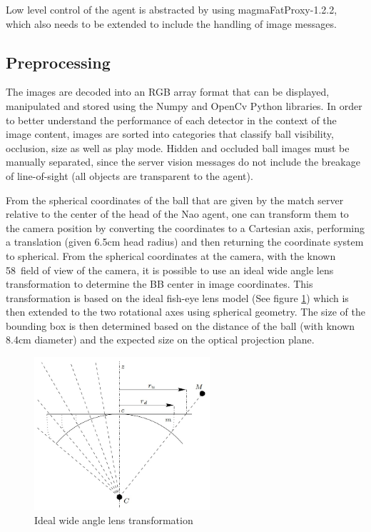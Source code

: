 \documentclass[a4paper,twoside,12pt]{report}
\begin{document}
Low level control of the agent is abstracted by using magmaFatProxy-1.2.2, which also needs to be extended to include the handling of image messages.

\subsection{Preprocessing}

The images are decoded into an RGB array format that can be displayed, manipulated and stored using the Numpy and OpenCv Python libraries. In order to better understand the performance of each detector in the context of the image content, images are sorted into categories that classify ball visibility, occlusion, size as well as play mode. Hidden and occluded ball images must be manually separated, since the server vision messages do not include the breakage of line-of-sight (all objects are transparent to the agent).

From the spherical coordinates of the ball that are given by the match server relative to the center of the head of the Nao agent, one can transform them to the camera position by converting the coordinates to a Cartesian axis, performing a translation (given 6.5cm head radius) and then returning the coordinate system to spherical. From the spherical coordinates at the camera, with the known 58\textdegree\ field of view of the camera, it is possible to use an ideal wide angle lens transformation to determine the BB center in image coordinates. This transformation is based on the ideal fish-eye lens model (See figure \ref{fig:wideangle}) which is then extended to the two rotational axes using spherical geometry. The size of the bounding box is then determined based on the distance of the ball (with known 8.4cm diameter) and the expected size on the optical projection plane.

\begin{figure}[h!]
\begin{center}
\includegraphics[width=6.5cm]{images/FOVmodel.jpg}
\caption{Ideal wide angle lens transformation \citep{wideangle} }
\label{fig:wideangle}
\end{center}
\end{figure}
\end{document}
